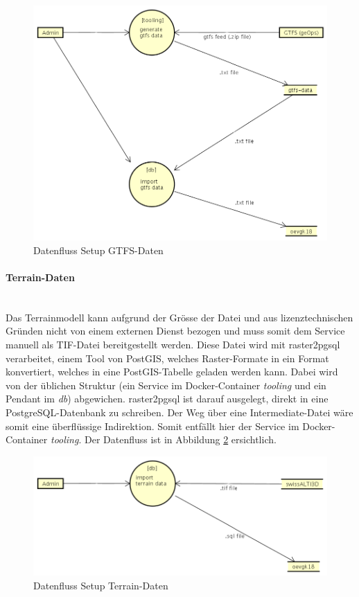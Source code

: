 \begin{figure}[ht]
    \centering
    \includegraphics[width=0.8\linewidth]{projectdoc/img/dataflow-docker-setup-gtfs-data.png}
    \caption[Datenfluss Setup GTFS-Daten]{Datenfluss Setup GTFS-Daten}
    \label{fig:dataflow-docker-setup-gtfs-data}
\end{figure}

\paragraph{Terrain-Daten}~\\
Das \gls{Terrainmodell} kann aufgrund der Grösse der Datei und aus lizenztechnischen Gründen nicht von einem externen Dienst bezogen und muss somit dem Service manuell als TIF-Datei bereitgestellt werden.
Diese Datei wird mit raster2pgsql~\cite{raster2pgsql} verarbeitet, einem Tool von PostGIS, welches Raster-Formate in ein Format konvertiert, welches in eine PostGIS-Tabelle geladen werden kann.
Dabei wird von der üblichen Struktur (ein Service im Docker-Container \emph{tooling} und ein Pendant im \emph{db}) abgewichen.
raster2pgsql ist darauf ausgelegt, direkt in eine PostgreSQL-Datenbank zu schreiben.
Der Weg über eine Intermediate-Datei wäre somit eine überflüssige Indirektion.
Somit entfällt hier der Service im Docker-Container \emph{tooling}.
Der Datenfluss ist in Abbildung \ref{fig:dataflow-docker-setup-terrain-data} ersichtlich.

\begin{figure}[ht]
    \centering
    \includegraphics[width=0.8\linewidth]{projectdoc/img/dataflow-docker-setup-terrain-data.png}
    \caption[Datenfluss Setup Terrain-Daten]{Datenfluss Setup Terrain-Daten}
    \label{fig:dataflow-docker-setup-terrain-data}
\end{figure}

